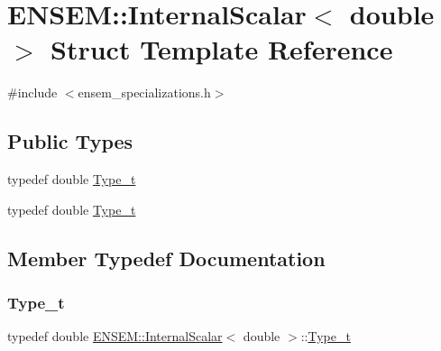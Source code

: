 \hypertarget{structENSEM_1_1InternalScalar_3_01double_01_4}{}\section{E\+N\+S\+EM\+:\+:Internal\+Scalar$<$ double $>$ Struct Template Reference}
\label{structENSEM_1_1InternalScalar_3_01double_01_4}


{\ttfamily \#include $<$ensem\+\_\+specializations.\+h$>$}

\subsection*{Public Types}
\begin{DoxyCompactItemize}
\item 
typedef double \mbox{\hyperlink{structENSEM_1_1InternalScalar_3_01double_01_4_a27d32499b6d6d1ba4b217a7276cc8916}{Type\+\_\+t}}
\item 
typedef double \mbox{\hyperlink{structENSEM_1_1InternalScalar_3_01double_01_4_a27d32499b6d6d1ba4b217a7276cc8916}{Type\+\_\+t}}
\end{DoxyCompactItemize}


\subsection{Member Typedef Documentation}
\mbox{\label{structENSEM_1_1InternalScalar_3_01double_01_4_a27d32499b6d6d1ba4b217a7276cc8916}} 
\subsubsection{\texorpdfstring{Type\_t}{Type\_t}\hspace{0.1cm}{\footnotesize\ttfamily [1/2]}}
{\footnotesize\ttfamily typedef double \mbox{\hyperlink{structENSEM_1_1InternalScalar}{E\+N\+S\+E\+M\+::\+Internal\+Scalar}}$<$ double $>$\+::\mbox{\hyperlink{structENSEM_1_1InternalScalar_3_01double_01_4_a27d32499b6d6d1ba4b217a7276cc8916}{Type\+\_\+t}}}

\mbox{\label{structENSEM_1_1InternalScalar_3_01double_01_4_a27d32499b6d6d1ba4b217a7276cc8916}} 
